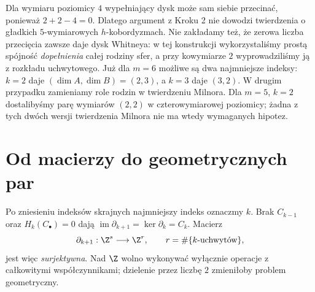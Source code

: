 \begin{uwaga}
Dla wymiaru poziomicy $4$
wypełniający dysk może sam siebie
przecinać, ponieważ $2+2-4=0$.
Dlatego argument z Kroku 2
nie dowodzi twierdzenia o
gładkich $5$-wymiarowych
$h$-kobordyzmach.
Nie zakładamy też, że
zerowa liczba przecięcia
zawsze daje dysk Whitneya:
w tej konstrukcji wykorzystaliśmy prostą
spójność \emph{dopełnienia} całej rodziny sfer,
a przy kowymiarze $2$ wyprowadziliśmy ją z rozkładu uchwytowego.
Już dla $m=6$ możliwe są dwa najmniejsze indeksy:
$k=2$ daje $(\dim A,\dim B)=(2,3)$, a $k=3$ daje $(3,2)$.
W drugim przypadku zamieniamy role rodzin w twierdzeniu Milnora.
Dla $m=5$, $k=2$ dostalibyśmy parę wymiarów $(2,2)$
w czterowymiarowej poziomicy; żadna z tych dwóch wersji
twierdzenia Milnora nie ma wtedy wymaganych hipotez.
\end{uwaga}

\section{Od macierzy do geometrycznych par}
\label{sec:macierze-hc-19}

Po zniesieniu indeksów skrajnych
najmniejszy indeks oznaczmy $k$.
Brak $C_{k-1}$ oraz
$H_k(C_\bullet)=0$ dają
$\operatorname{im}\partial_{k+1}
=\ker\partial_k=C_k$.
Macierz
\[
 \partial_{k+1}:\Z^s\longrightarrow\Z^r,
 \qquad r=\#\{k\text{-uchwytów}\},
\]
jest więc \emph{surjektywna}.
Nad $\Z$ wolno wykonywać
wyłącznie operacje z
całkowitymi współczynnikami;
dzielenie przez liczbę $2$
zmieniłoby problem geometryczny.

